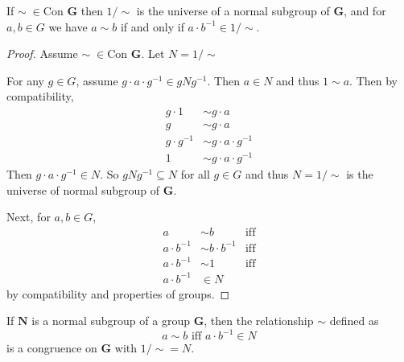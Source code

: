 \begin{theorem*}
If $\sim\; \in \text{Con }\mathbf{G}$ then $1/\sim$ is the universe of a normal subgroup of $\mathbf{G}$, and for $a,b\in G$ we have $a\sim b$ if and only if $a\cdot b^{-1} \in 1/\sim$.
\end{theorem*}

\begin{proof}
Assume  $\sim\; \in \text{Con }\mathbf{G}$.
Let $N = 1 / \sim$

For any $g \in G$, assume $g\cdot a\cdot g^{-1} \in gNg^{-1}$.
Then $a \in N$ and thus $1 \sim a$.
Then by compatibility, 
\begin{align*}
g\cdot 1       &\sim g\cdot a \\
g              &\sim g\cdot a \\
g \cdot g^{-1} &\sim g\cdot a \cdot g^{-1} \\
1              &\sim g\cdot a \cdot g^{-1}
\end{align*}
Then $g\cdot a \cdot g^{-1} \in N$.
So $gNg^{-1} \subseteq N$ for all $g \in G$ and thus $N = 1/\sim$ is the universe of  normal subgroup of $\mathbf{G}$.

Next, for $a, b \in G$,
\begin{align*}
a            &\sim b              & \text{iff} \\
a\cdot b^{-1} &\sim b\cdot b^{-1} & \text{iff} \\
a\cdot b^{-1} &\sim 1             & \text{iff} \\
a\cdot b^{-1} &\in N
\end{align*}
by compatibility and properties of groups.
\end{proof}

\begin{theorem*}
If $\mathbf{N}$ is a normal subgroup of a group $\mathbf{G}$, then the relationship $\sim$ defined as
\[
 a\sim b \text{ iff } a\cdot b^{-1} \in N
\]
is a congruence on $\mathbf{G}$ with $1/\sim = N$.
\end{theorem*}

